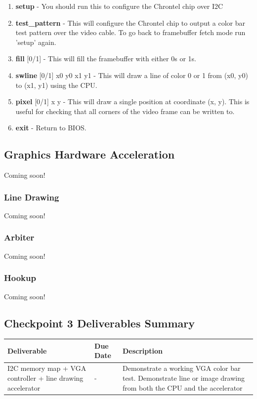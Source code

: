 \documentclass[11pt]{article}
\begin{document}
\begin{enumerate}
	\item \textbf{setup} - You should run this to configure the Chrontel chip over I2C
	\item \textbf{test\_pattern} - This will configure the Chrontel chip to output a color bar test pattern over the video cable. To go back to framebuffer fetch mode run 'setup' again.
	\item \textbf{fill} [0/1] - This will fill the framebuffer with either 0s or 1s.
	\item \textbf{swline} [0/1] x0 y0 x1 y1 - This will draw a line of color 0 or 1 from (x0, y0) to (x1, y1) using the CPU.
	\item \textbf{pixel} [0/1] x y - This will draw a single position at coordinate (x, y). This is useful for checking that all corners of the video frame can be written to.
	\item \textbf{exit} - Return to BIOS.
\end{enumerate}

\subsection{Graphics Hardware Acceleration}
Coming soon!

\subsubsection{Line Drawing}
Coming soon!

\subsubsection{Arbiter}
Coming soon!

\subsubsection{Hookup}
Coming soon!

\subsection{Checkpoint 3 Deliverables Summary}

\begin{center}
	\begin{tabular}{m{30mm} m{35mm} m{70mm}}
		\toprule
		\textbf{Deliverable} & \textbf{Due Date} & \textbf{Description} \\
		\midrule
		I2C memory map + VGA controller + line drawing accelerator & \ethernetDueDate \space - \dueDateTime & Demonstrate a working VGA color bar test. Demonstrate line or image drawing from both the CPU and the accelerator \\
		\bottomrule
	\end{tabular}
\end{center}
\end{document}
